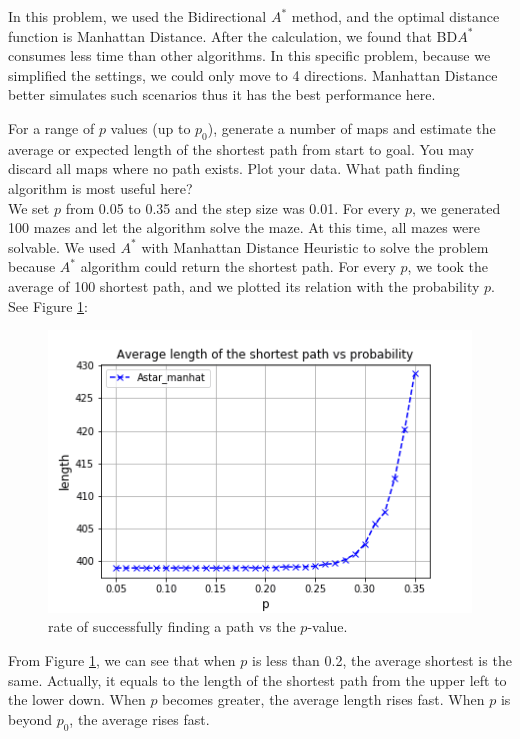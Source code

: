 \documentclass[letter]{article}
\begin{document}
\begin{questions}
	In this problem, we used the Bidirectional $ A^* $ method, and the optimal distance function is Manhattan Distance. After the calculation, we found that BD$ A^* $ consumes less time than other algorithms. In this specific problem, because we simplified the settings, we could only move to 4 directions. Manhattan Distance better simulates such scenarios thus it has the best performance here. \\
	
	
	\item {For a range of $ p $ values (up to $ p_0 $), generate a number of maps and estimate the average or expected length of the shortest path from start to goal. You may discard all maps where no path exists. Plot your data. What path finding algorithm is most useful here?} \\
	
	We set $ p $ from 0.05 to 0.35 and the step size was 0.01. For every $ p $, we generated 100 mazes and let the algorithm solve the maze. At this time, all mazes were solvable. We used $ A^* $ with Manhattan Distance Heuristic to solve the problem because $ A^* $ algorithm could return the shortest path. For every $ p $, we took the average of 100 shortest path, and we plotted its relation with the probability $ p $. See Figure \ref{fig:4}: \\
		
	\begin{figure}
		\centering
		\includegraphics[width=\textwidth]{../pics/question4.png}
		\caption{\label{fig:4}rate of successfully finding a path vs the $ p $-value.}
	\end{figure}

	From Figure \ref{fig:4}, we can see that when $ p $ is less than 0.2, the average shortest is the same. Actually, it equals to the length of the shortest path from the upper left to the lower down. When $ p $ becomes greater, the average length rises fast. When $ p $ is beyond $ p_0 $, the average rises fast. \\
	

\end{questions}
\end{document}
